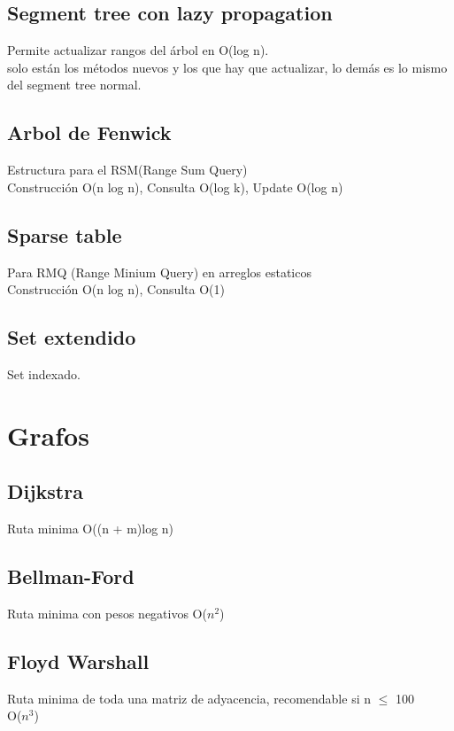 \documentclass[10pt,landscape,twocolumn,letterpaper,twosided]{article}
\newcommand\cppfile[2][]{

}
\begin{document}
			\subsection{Segment tree con lazy propagation}
			Permite actualizar rangos del árbol en O(log n).\\
			solo están los métodos nuevos y los que hay que actualizar, lo demás es lo mismo del segment tree normal.
			\cppfile[29-84]{estructuras_de_datos/segment_tree_lazy_propagation.cpp}
			\subsection{Arbol de Fenwick}
			Estructura para el RSM(Range Sum Query)\\
			Construcción O(n log n), Consulta O(log k), Update O(log n)
			\cppfile[8-35]{estructuras_de_datos/arbol_binario_indexado.cpp}
			\subsection{Sparse table}
			Para RMQ (Range Minium Query) en arreglos estaticos\\
			Construcción O(n log n), Consulta O(1)
			\cppfile[8-35]{estructuras_de_datos/Sparse_table.cpp}
			\subsection{Set extendido}
			Set indexado.
			\cppfile[2-10]{estructuras_de_datos/set_extendido.cpp}
			
		\section{Grafos}
			\subsection{Dijkstra}
			Ruta minima
			O((n + m)log n)
			\cppfile[12-46]{grafos/dijkstra.cpp}
			\subsection{Bellman-Ford}
			Ruta minima con pesos negativos
			O($n^{2}$)
			\cppfile[12-33]{grafos/bellman-Ford.cpp}
			\subsection{Floyd Warshall}
			Ruta minima de toda una matriz de adyacencia, recomendable si n $\leq$ 100\\	
			O($n^{3}$)
			\cppfile[8-36]{grafos/floyd.cpp}
\end{document}
